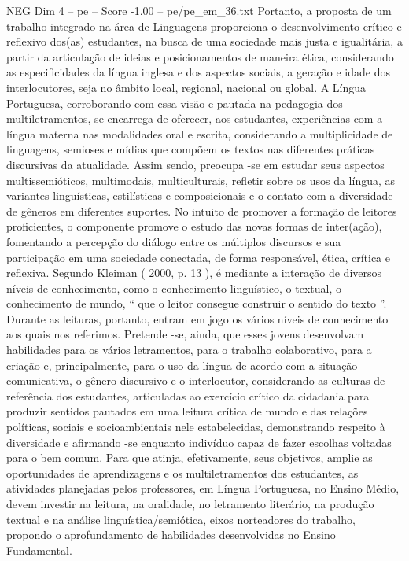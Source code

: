 \begin{textsample}{NEG Dim 4 – pe – Score -1.00 – pe/pe\_em\_36.txt}
Portanto, a proposta de um trabalho integrado na área de Linguagens proporciona o desenvolvimento crítico e reflexivo dos(as) estudantes, na busca de uma sociedade mais justa e igualitária, a partir da articulação de ideias e posicionamentos de maneira ética, considerando as especificidades da língua inglesa e dos aspectos sociais, a geração e idade dos interlocutores, seja no âmbito local, regional, nacional ou global.
A Língua Portuguesa, corroborando com essa visão e pautada na pedagogia dos multiletramentos, se encarrega de oferecer, aos estudantes, experiências com a língua materna nas modalidades oral e escrita, considerando a multiplicidade de linguagens, semioses e mídias que compõem os textos nas diferentes práticas discursivas da atualidade.
Assim sendo, preocupa -se em estudar seus aspectos multissemióticos, multimodais, multiculturais, refletir sobre os usos da língua, as variantes linguísticas, estilísticas e composicionais e o contato com a diversidade de gêneros em diferentes suportes.
No intuito de promover a formação de leitores proficientes, o componente promove o estudo das novas formas de inter(ação), fomentando a percepção do diálogo entre os múltiplos discursos e sua participação em uma sociedade conectada, de forma responsável, ética, crítica e reflexiva.
Segundo Kleiman ( 2000, p. 13 ), é mediante a interação de diversos níveis de conhecimento, como o conhecimento linguístico, o textual, o conhecimento de mundo, “ que o leitor consegue construir o sentido do texto ”.
Durante as leituras, portanto, entram em jogo os vários níveis de conhecimento aos quais nos referimos.
Pretende -se, ainda, que esses jovens desenvolvam habilidades para os vários letramentos, para o trabalho colaborativo, para a criação e, principalmente, para o uso da língua de acordo com a situação comunicativa, o gênero discursivo e o interlocutor, considerando as culturas de referência dos estudantes, articuladas ao exercício crítico da cidadania para produzir sentidos pautados em uma leitura crítica de mundo e das relações políticas, sociais e socioambientais nele estabelecidas, demonstrando respeito à diversidade e afirmando -se enquanto indivíduo capaz de fazer escolhas voltadas para o bem comum.
Para que atinja, efetivamente, seus objetivos, amplie as oportunidades de aprendizagens e os multiletramentos dos estudantes, as atividades planejadas pelos professores, em Língua Portuguesa, no Ensino Médio, devem investir na leitura, na oralidade, no letramento literário, na produção textual e na análise linguística/semiótica, eixos norteadores do trabalho, propondo o aprofundamento de habilidades desenvolvidas no Ensino Fundamental.

\end{textsample}
